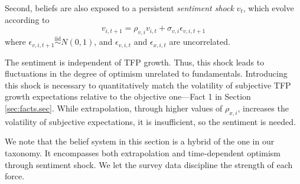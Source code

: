 Second, beliefs are also exposed to a persistent \textit{sentiment shock} $v_{t}$, which evolve according to
\begin{equation}
    v_{i,t+1} = \rho_{v,i} v_{i,t} + \sigma_{v,i} \epsilon_{v,i,t+1}
\end{equation}
where $\epsilon_{v,i,t+1} \overset{\text{iid}}{\sim} N(0,1)$, and $\epsilon_{v,i,t}$ and $\epsilon_{x,i,t}$ are uncorrelated. 

The sentiment is independent of TFP growth. Thus, this shock leads to fluctuations in the degree of optimism unrelated to fundamentals. Introducing this shock is necessary to quantitatively match the volatility of subjective TFP growth expectations relative to the objective one---Fact 1 in Section \ref{sec:facts.sec}. While extrapolation, through higher values of $\rho_{x,i}$, increases the volatility of subjective expectations, it is insufficient, so the sentiment is needed. 

We note that the belief system in this section is a hybrid of the one in our taxonomy. It encompasses both extrapolation and time-dependent optimism through sentiment shock. We let the survey data discipline the strength of each force. 


